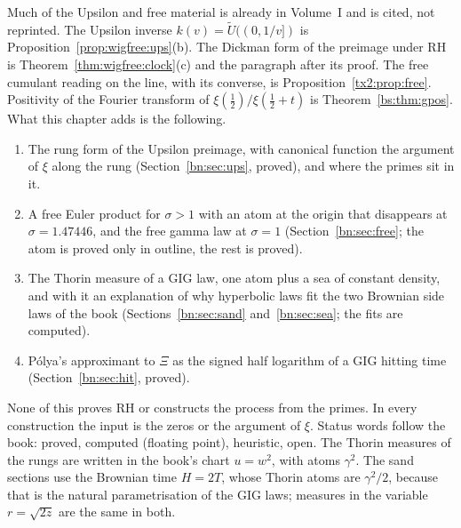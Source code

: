Much of the Upsilon and free material is already in Volume~I and is cited, not reprinted. The Upsilon inverse $k(v)=\widetilde U((0,1/v])$ is Proposition~\ref{prop:wigfree:ups}(b). The Dickman form of the preimage under RH is Theorem~\ref{thm:wigfree:clock}(c) and the paragraph after its proof. The free cumulant reading on the line, with its converse, is Proposition~\ref{tx2:prop:free}. Positivity of the Fourier transform of $\xi(\frac12)/\xi(\frac12+t)$ is Theorem~\ref{bs:thm:gpos}. What this chapter adds is the following.
\begin{enumerate}
\item The rung form of the Upsilon preimage, with canonical function the argument of $\xi$ along the rung (Section~\ref{bn:sec:ups}, proved), and where the primes sit in it.
\item A free Euler product for $\sigma>1$ with an atom at the origin that disappears at $\sigma=1.47446$, and the free gamma law at $\sigma=1$ (Section~\ref{bn:sec:free}; the atom is proved only in outline, the rest is proved).
\item The Thorin measure of a GIG law, one atom plus a sea of constant density, and with it an explanation of why hyperbolic laws fit the two Brownian side laws of the book (Sections~\ref{bn:sec:sand} and~\ref{bn:sec:sea}; the fits are computed).
\item P\'olya's approximant to $\Xi$ as the signed half logarithm of a GIG hitting time (Section~\ref{bn:sec:hit}, proved).
\end{enumerate}
None of this proves RH or constructs the process from the primes. In every construction the input is the zeros or the argument of $\xi$. Status words follow the book: proved, computed (floating point), heuristic, open. The Thorin measures of the rungs are written in the book's chart $u=w^2$, with atoms $\gamma^2$. The sand sections use the Brownian time $H=2T$, whose Thorin atoms are $\gamma^2/2$, because that is the natural parametrisation of the GIG laws; measures in the variable $r=\sqrt{2z}$ are the same in both.

